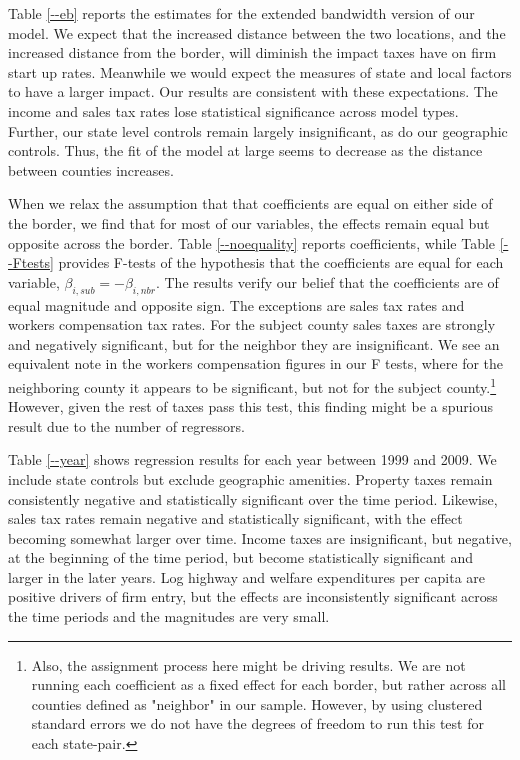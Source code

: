 \documentclass[12pt,a4paper]{article}
\begin{document}
Table \ref{--eb} reports the estimates for the extended bandwidth version of our model. We expect that the increased distance between the two locations, and the increased distance from the border, will diminish the impact taxes have on firm start up rates.  Meanwhile we would expect the  measures of state and local factors to have a larger impact.  Our results are consistent with these expectations. The income and sales tax rates lose statistical significance across model types. Further, our state level controls remain largely insignificant, as do our geographic controls. Thus, the fit of the model at large seems to decrease as the distance between counties increases. 

When we relax the assumption that  that coefficients are equal on either side of the border, we find that for most of our variables, the effects remain equal but opposite across the border. Table \ref{--noequality} reports coefficients, while Table \ref{--Ftests} provides F-tests of the hypothesis that the coefficients are equal for each variable, $\beta_{i,sub} = - \beta_{i,nbr}$. The results verify our belief that the coefficients are of equal magnitude and opposite sign. The exceptions are sales tax rates and workers compensation tax rates. For the subject county sales taxes are strongly and negatively significant, but for the neighbor they are insignificant. We see an equivalent note in the workers compensation figures in our F tests, where for the neighboring county it appears to be significant, but not for the subject county.\footnote{Also, the assignment process here might be driving results. We are not running each coefficient as a fixed effect for each border, but rather across all counties defined as "neighbor" in our sample. However, by using clustered standard errors we do not have the degrees of freedom to run this test for each state-pair.} However, given the rest of taxes pass this test, this finding might be a spurious result due to the number of regressors.

Table \ref{--year} shows regression results for each  year between 1999 and 2009. We include state controls but exclude geographic amenities. Property taxes remain consistently negative and statistically significant over the time period. Likewise, sales tax rates remain negative and statistically significant, with the effect becoming somewhat larger over time.  Income taxes are insignificant, but negative, at the beginning of the time period, but  become statistically significant and larger in the later years. Log highway and welfare expenditures per capita are positive drivers of firm entry, but the effects are inconsistently significant across the time periods and the magnitudes are very small.
\end{document}
